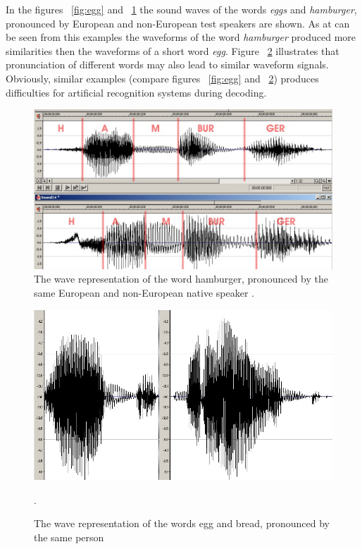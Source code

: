 \documentclass[11pt,a4paper]{report}
\begin{document}
 In the figures ~\ref{fig:egg} and ~\ref{fig:hamburger} the
sound waves of the words \textit {eggs} and \textit{hamburger}, pronounced by
European and non-European test speakers are shown. As at can be seen from this examples the waveforms of the word \textit {hamburger}
produced more similarities then the waveforms of a short word \textit {egg}. 
Figure ~\ref{fig:egg-bread} illustrates that pronunciation of different words
may also lead to similar waveform signals. Obviously, similar examples
(compare figures ~\ref{fig:egg} and ~\ref{fig:egg-bread}) produces difficulties
for artificial recognition systems during decoding. 
 \begin  {figure} [h]
\begin {center}
     \includegraphics[height=5.0 cm]{hamburger}
     \caption {The wave representation of the word hamburger, pronounced by the
     same European and non-European native speaker \citep
     {SpeechRecognition}.}
     \label {fig:hamburger}
     \end {center}
     \end {figure}
\begin {figure} [h]
     \begin {center}
     \includegraphics[height=5.0 cm]{egg-bread}
     \caption {The wave representation of the words egg and bread, pronounced
     by the same person\citep
     {SpeechRecognition}}.
     \label {fig:egg-bread}
     \end {center}
     \end {figure}
\end{document}
